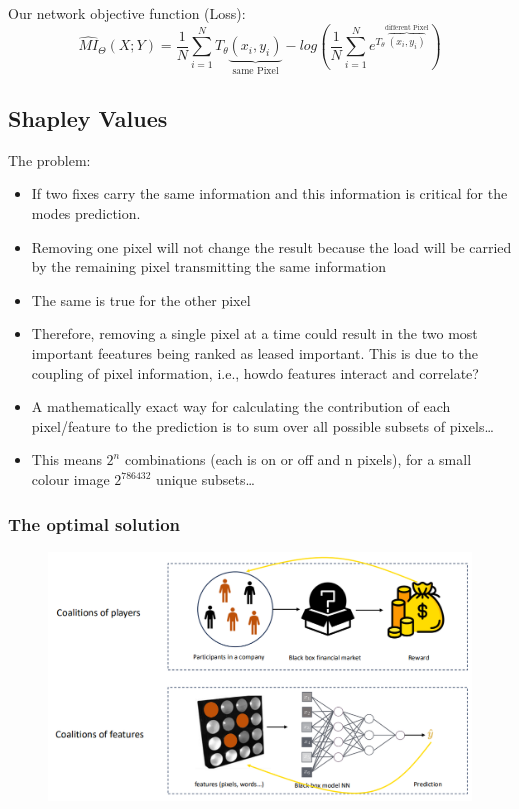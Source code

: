 Our network objective function (Loss):
\[
\hat{MI}_{\Theta}(X;Y) = \frac{1}{N}\sum_{i = 1}^{N}T_\theta\underbrace{(x_i,y_i)}_{\text{same Pixel}} - log \left(\frac{1}{N}\sum_{i=1}^{N}e^{T_\theta\overbrace{(x_i,y_i)}^{\text{different Pixel}}}\right)
\]

\subsection{Shapley Values}
The problem:
\begin{itemize}
    \item If two fixes carry the same information and this information is critical for the modes prediction.
    \item Removing one pixel will not change the result because the load will be carried by the remaining pixel transmitting the same information
    \item The same is true for the other pixel
    \item Therefore, removing a single pixel at a time could result in the two most important feeatures being ranked as leased important. This is due to the coupling of pixel information, i.e., howdo features interact and correlate?
    \item  A mathematically exact way for calculating the contribution of each pixel/feature to the prediction is to sum over all possible subsets of pixels\dots
    \item This means \(2^n\) combinations (each is on or off and n pixels), for a small colour image \(2^786432\) unique subsets\dots
\end{itemize}

\subsubsection{The optimal solution}
\begin{figure}[!h]
    \includegraphics[width = \columnwidth]{figures/XAI3/ShapleyValuesGameTheory.png}
\end{figure}
